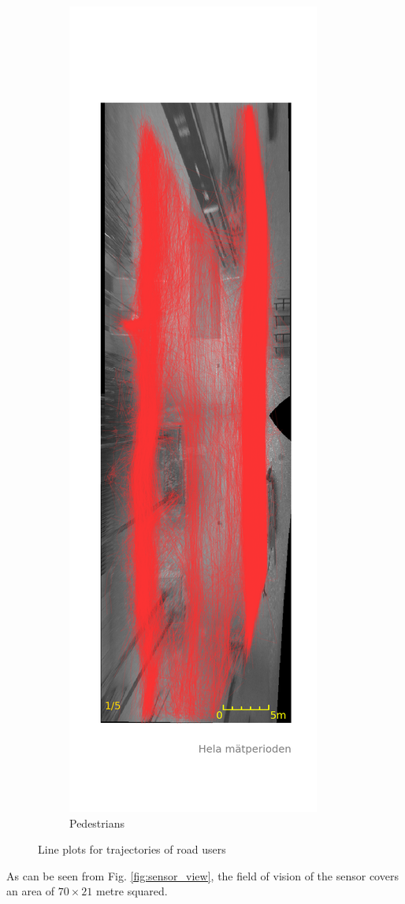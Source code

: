 \documentclass{article}
\begin{document}
\begin{figure}[H]
\begin{subfigure}{.3\textwidth}
  \includegraphics[width=.5\linewidth]{data/Data_4.png}
  \caption{Pedestrians}
  \label{fig:ped_shu}
\end{subfigure}
\caption{Line plots for trajectories of road users}
\label{fig:trajectories}
\end{figure}

As can be seen from Fig. \ref{fig:sensor_view}, the field of vision of the sensor covers an area of $70 \times 21$ metre squared. 
\end{document}
